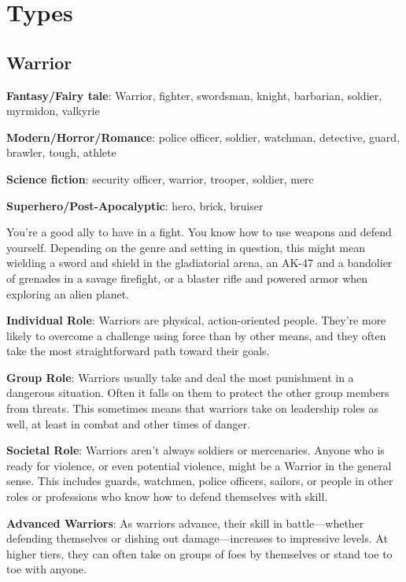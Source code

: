 \chapter{Types}

\section{Warrior}

\textbf{Fantasy/Fairy tale}: Warrior, fighter, swordsman, knight, barbarian, soldier, myrmidon, valkyrie

\textbf{Modern/Horror/Romance}: police officer, soldier, watchman, detective, guard, brawler, tough, athlete

\textbf{Science fiction}: security officer, warrior, trooper, soldier, merc

\textbf{Superhero/Post-Apocalyptic}: hero, brick, bruiser

You’re a good ally to have in a fight. You know how to use weapons and defend yourself. Depending on the genre and setting in question, this might mean wielding a sword and shield in the gladiatorial arena, an AK-47 and a bandolier of grenades in a savage firefight, or a blaster rifle and powered armor when exploring an alien planet.

\textbf{Individual Role}: Warriors are physical, action-oriented people. They’re more likely to overcome a challenge using force than by other means, and they often take the most straightforward path toward their goals. 

\textbf{Group Role}: Warriors usually take and deal the most punishment in a dangerous situation. Often it falls on them to protect the other group members from threats. This sometimes means that warriors take on leadership roles as well, at least in combat and other times of danger.

\textbf{Societal Role}: Warriors aren’t always soldiers or mercenaries. Anyone who is ready for violence, or even potential violence, might be a Warrior in the general sense. This includes guards, watchmen, police officers, sailors, or people in other roles or professions who know how to defend themselves with skill. 

\textbf{Advanced Warriors}: As warriors advance, their skill in battle—whether defending themselves or dishing out damage—increases to impressive levels. At higher tiers, they can often take on groups of foes by themselves or stand toe to toe with anyone.

